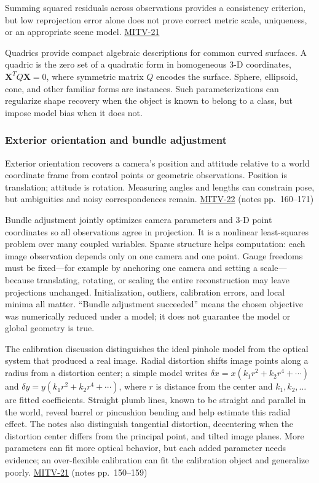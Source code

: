 Summing squared residuals across observations provides a consistency criterion, but low reprojection error alone does not prove correct metric scale, uniqueness, or an appropriate scene model. \hyperref[04-visual-computing-ii-ch036]{MITV-21}

Quadrics provide compact algebraic descriptions for common curved surfaces. A quadric is the zero set of a quadratic form in homogeneous 3-D coordinates, \(\mathbf{X}^TQ\mathbf{X}=0\), where symmetric matrix \(Q\) encodes the surface. Sphere, ellipsoid, cone, and other familiar forms are instances. Such parameterizations can regularize shape recovery when the object is known to belong to a class, but impose model bias when it does not.

\subsubsection{Exterior orientation and bundle adjustment}\label{exterior-orientation-and-bundle-adjustment}

Exterior orientation recovers a camera's position and attitude relative to a world coordinate frame from control points or geometric observations. Position is translation; attitude is rotation. Measuring angles and lengths can constrain pose, but ambiguities and noisy correspondences remain. \hyperref[04-visual-computing-ii-ch036]{MITV-22} (notes pp.~160--171)

Bundle adjustment jointly optimizes camera parameters and 3-D point coordinates so all observations agree in projection. It is a nonlinear least-squares problem over many coupled variables. Sparse structure helps computation: each image observation depends only on one camera and one point. Gauge freedoms must be fixed---for example by anchoring one camera and setting a scale---because translating, rotating, or scaling the entire reconstruction may leave projections unchanged. Initialization, outliers, calibration errors, and local minima all matter. ``Bundle adjustment succeeded'' means the chosen objective was numerically reduced under a model; it does not guarantee the model or global geometry is true.

The calibration discussion distinguishes the ideal pinhole model from the optical system that produced a real image. Radial distortion shifts image points along a radius from a distortion center; a simple model writes \(\delta x=x(k_1r^2+k_2r^4+\cdots)\) and \(\delta y=y(k_1r^2+k_2r^4+\cdots)\), where \(r\) is distance from the center and \(k_1,k_2,\ldots\) are fitted coefficients. Straight plumb lines, known to be straight and parallel in the world, reveal barrel or pincushion bending and help estimate this radial effect. The notes also distinguish tangential distortion, decentering when the distortion center differs from the principal point, and tilted image planes. More parameters can fit more optical behavior, but each added parameter needs evidence; an over-flexible calibration can fit the calibration object and generalize poorly. \hyperref[04-visual-computing-ii-ch036]{MITV-21} (notes pp.~150--159)

